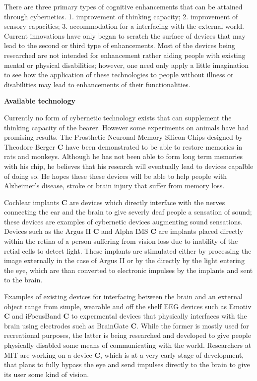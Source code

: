 There are three primary types of cognitive enhancements that can be attained through cybernetics. 1. improvement of thinking capacity; 2. improvement of sensory capacities; 3. accommodation for a interfacing with the external world. Current innovations have only began to scratch the surface of devices that may lead to the second or third type of enhancements. Most of the devices being researched are not intended for enhancement rather aiding people with existing mental or physical disabilities; however, one need only apply a little imagination to see how the application of these technologies to people without illness or disabilities may lead to enhancements of their functionalities.

{\bf Available technology}

Currently no form of cybernetic technology exists that can supplement the thinking capacity of the bearer. However some experiments on animals have had promising results. The Prosthetic Neuronal Memory Silicon Chips designed by Theodore Berger {\bf C} have been demonstrated to be able to restore memories in rats and monkeys. Although he has not been able to form long term memories with his chip, he believes that his research will eventually lead to devices capalble of doing so. He hopes these these devices will be able to help people with Alzheimer's disease, stroke or brain injury that suffer from memory loss.

Cochlear implants {\bf C} are devices which directly interface with the nerves connecting the ear and the brain to give severly deaf people a sensation of sound; these devices are examples of cybernetic devices augmenting sound sensations. Devices such as the Argus II {\bf C} and Alpha IMS {\bf C} are implants placed directly within the retina of a person suffering from vision loss due to inability of the retial cells to detect light. These implants are stimulated either by processing the image externally in the case of Argus II or by the directly by the light entering the eye, which are than converted to electronic impulses by the implants and sent to the brain. 

Examples of existing devices for interfacing between the brain and an external object range from simple, wearable and off the shelf EEG devices such as Emotiv {\bf C} and iFocusBand {\bf C} to expermental devices that physically interfaces with the brain using electrodes such as BrainGate {\bf C}. While the former is mostly used for recreational purposes, the latter is being researched and developed to give people physically disabled some means of communicating with the world. Researchers at MIT are working on a device {\bf C}, which is at a very early stage of development, that plans to fully bypass the eye and send impulses directly to the brain to give its user some kind of vision.


